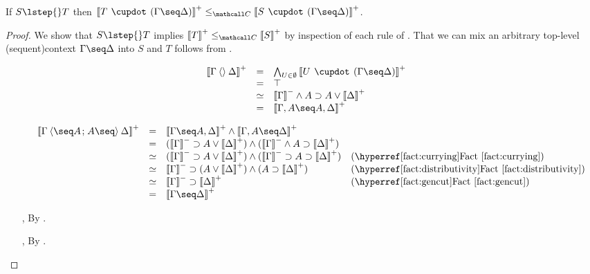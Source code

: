 \begin{lemma}
  
  If $S \lstep{} T$ then $\psint{T \mix (\Gamma \seq \Delta)} \sementC \psint{S
  \mix (\Gamma \seq \Delta)}$.
\end{lemma}
\begin{proof}
  We show that $S \lstep{} T$ implies $\psint{T} \sementC \psint{S}$ by inspection
  of each rule of . That we can mix an arbitrary top-level \kl(sequent){context}
  $\Gamma \seq \Delta$ into $S$ and $T$ follows from .

  \def\arraystretch{1.25}
  \begin{itemize}
    \item[\rsf{i{\da}}]
    $$
    \begin{array}{rcll}
      \psint{\Gamma \piq{} \Delta}
      &=& \bigwedge_{U \in \emptyset}{\psint{U \mix (\Gamma \seq \Delta)}} &\\
      &=& \top & \\
      &\semequiv& \nsint{\Gamma} \wedge A \limp A \lor \psint{\Delta} &\\
      &=& \psint{\Gamma, A \seq A, \Delta}
    \end{array}
    $$
    \item[\rsf{i{\ua}}]
    $$
    \begin{array}{rcll}
      \psint{\Gamma \piq{\seq A \sep A \seq} \Delta}
      &=& \psint{\Gamma \seq A, \Delta} \wedge \psint{\Gamma, A \seq \Delta} & \\
      &=& (\nsint{\Gamma} \limp A \lor \psint{\Delta}) \land (\nsint{\Gamma} \land A \limp \psint{\Delta}) & \\
      &\semequiv& (\nsint{\Gamma} \limp A \lor \psint{\Delta}) \wedge (\nsint{\Gamma} \limp A \limp \psint{\Delta}) &\text{(\reffact{currying})}\\
      &\semequiv& \nsint{\Gamma} \limp (A \lor \psint{\Delta}) \wedge (A \limp \psint{\Delta}) &\text{(\reffact{distributivity})}\\
      &\semequiv& \nsint{\Gamma} \limp \psint{\Delta} &\text{(\reffact{gencut})}\\
      &=& \psint{\Gamma \seq \Delta} & \\
    \end{array}
    $$
    \item[{\rsf{w{-}}}, {\rsf{w{+}}}] By .
    \item[{\rsf{c{-}}}, {\rsf{c{+}}}] By .


\end{itemize}
\end{proof}
